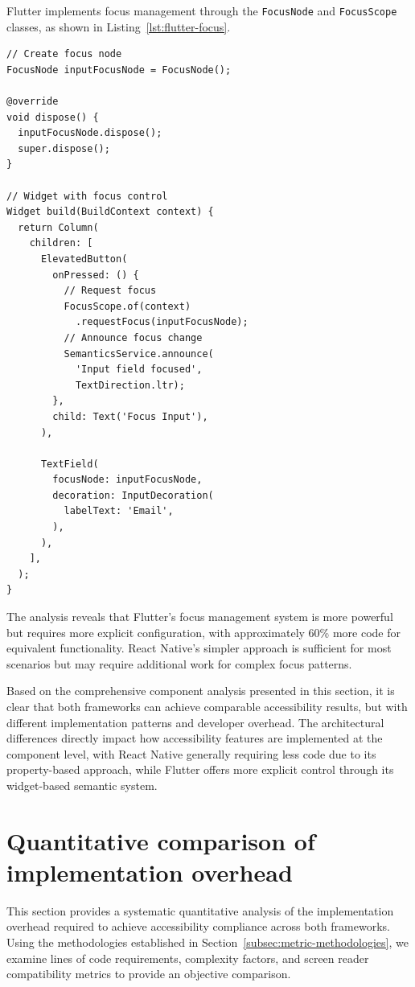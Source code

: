 \FloatBarrier

Flutter implements focus management through the \texttt{FocusNode} and \texttt{FocusScope} classes, as shown in Listing~\ref{lst:flutter-focus}.

\begin{lstlisting}[style=DartStyle, caption=Focus management in Flutter, label=lst:flutter-focus]
// Create focus node
FocusNode inputFocusNode = FocusNode();

@override
void dispose() {
  inputFocusNode.dispose();
  super.dispose();
}

// Widget with focus control
Widget build(BuildContext context) {
  return Column(
    children: [
      ElevatedButton(
        onPressed: () {
          // Request focus
          FocusScope.of(context)
            .requestFocus(inputFocusNode);
          // Announce focus change
          SemanticsService.announce(
            'Input field focused',
            TextDirection.ltr);
        },
        child: Text('Focus Input'),
      ),
      
      TextField(
        focusNode: inputFocusNode,
        decoration: InputDecoration(
          labelText: 'Email',
        ),
      ),
    ],
  );
}
\end{lstlisting}

\pagebreak

The analysis reveals that Flutter's focus management system is more powerful but requires more explicit configuration, with approximately 60\% more code for equivalent functionality. React Native's simpler approach is sufficient for most scenarios but may require additional work for complex focus patterns.

Based on the comprehensive component analysis presented in this section, it is clear that both frameworks can achieve comparable accessibility results, but with different implementation patterns and developer overhead. The architectural differences directly impact how accessibility features are implemented at the component level, with React Native generally requiring less code due to its property-based approach, while Flutter offers more explicit control through its widget-based semantic system.

\section{Quantitative comparison of implementation overhead}
\label{sec:quantitative-comparison}

This section provides a systematic quantitative analysis of the implementation overhead required to achieve accessibility compliance across both frameworks. Using the methodologies established in Section~\ref{subsec:metric-methodologies}, we examine lines of code requirements, complexity factors, and screen reader compatibility metrics to provide an objective comparison.

